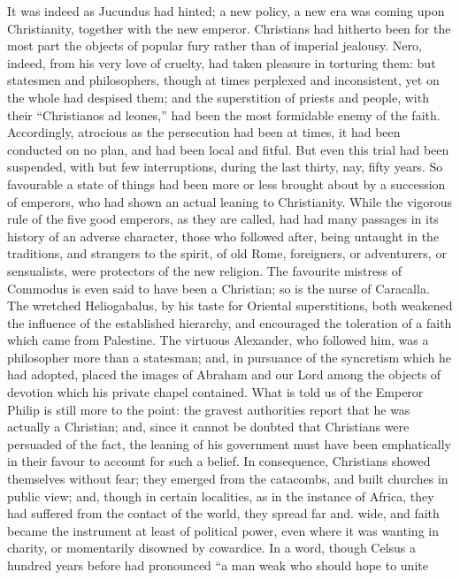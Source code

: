 It was indeed as Jucundus had hinted; a new policy, a new era was
coming upon Christianity, together with the new emperor. Christians
had hitherto been for the most part the objects of popular fury rather
than of imperial jealousy. Nero, indeed, from his very love of
cruelty, had taken pleasure in torturing them: but statesmen and
philosophers, though at times perplexed and inconsistent, yet on the
whole had despised them; and the superstition of priests and people,
with their ``Christianos ad leones,'' had been the most
formidable enemy of the faith. Accordingly, atrocious as the
persecution had been at times, it had been conducted on no plan, and
had been local and fitful. But even this trial had been
suspended, with but few interruptions, during the last thirty, nay,
fifty years. So favourable a state of things had been more or less
brought about by a succession of emperors, who had shown an actual
leaning to Christianity. While the vigorous rule of the five good
emperors, as they are called, had had many passages in its history of
an adverse character, those who followed after, being untaught in the
traditions, and strangers to the spirit, of old Rome, foreigners, or
adventurers, or sensualists, were protectors of the new religion. The
favourite mistress of Commodus is even said to have been a Christian;
so is the nurse of Caracalla. The wretched Heliogabalus, by his taste
for Oriental superstitions, both weakened the influence of the
established hierarchy, and encouraged the toleration of a faith which
came from Palestine. The virtuous Alexander, who followed him, was a
philosopher more than a statesman; and, in pursuance of the syncretism
which he had adopted, placed the images of Abraham and our Lord among
the objects of devotion which his private chapel contained. What is
told us of the Emperor Philip is still more to the point: the gravest
authorities report that he was actually a Christian; and, since it
cannot be doubted that Christians were persuaded of the fact, the
leaning of his government must have been emphatically in their favour
to account for such a belief. In consequence, Christians showed
themselves without fear; they emerged from the catacombs, and built
churches in public view; and, though in certain localities, as in
the instance of Africa, they had suffered from the contact of the
world, they spread far and. wide, and faith became the instrument at
least of political power, even where it was wanting in charity, or
momentarily disowned by cowardice. In a word, though Celsus a hundred
years before had pronounced ``a man weak who should hope to unite
